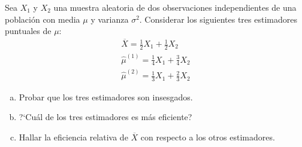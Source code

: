 \documentclass[12pt]{article}
\begin{document}
\begin{prob}
    Sea $X_{1}$ y $X_{2}$ una muestra aleatoria de dos observaciones
    independientes de
    una población con media $\mu$ y varianza $\sigma^2$. Considerar los
    siguientes tres estimadores puntuales de $\mu$:
    $$\begin{array}{l}
    \overline{X}=\frac{1}{2} X_{1}+\frac{1}{2} X_{2}\\
    \hat{\mu}^{(1)}=\frac{1}{4}X_{1}+\frac{3}{4} X_{2}\\
    \hat{\mu}^{(2)}=\frac{1}{3}X_{1}+\frac{2}{3} X_{2}
\end{array}
    $$
        \begin{enumerate}[a)]
        \item Probar que los tres estimadores son insesgados.
        \item ?`Cuál de los tres estimadores es más eficiente?
        \item Hallar la eficiencia relativa de $\overline{X}$ con respecto
        a los otros estimadores.
        \end{enumerate}
    \end{prob}
\end{document}
